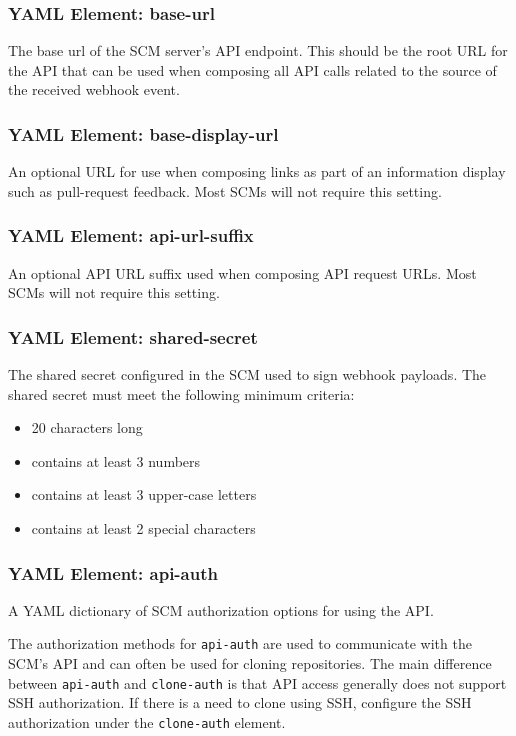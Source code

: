 \subsubsection{YAML Element: base-url}\label{sec:yaml-connection-base-url}
The base url of the SCM server's API endpoint. This should be the root URL for the API that can be used when composing all
API calls related to the source of the received webhook event.

\subsubsection{YAML Element: base-display-url}\label{sec:yaml-connection-base-display-url}
An optional URL for use when composing links as part of an information display such as pull-request
feedback. Most SCMs will not require this setting.

\subsubsection{YAML Element: api-url-suffix}\label{sec:yaml-connection-api-url-suffix}
An optional API URL suffix used when composing API request URLs. Most SCMs will not require this setting.

\subsubsection{YAML Element: shared-secret}\label{sec:yaml-connection-shared-secret}
The shared secret configured in the SCM used to sign webhook payloads. The shared secret must meet the
following minimum criteria: 

\begin{itemize}
  \item 20 characters long
  \item contains at least 3 numbers
  \item contains at least 3 upper-case letters
  \item contains at least 2 special characters
\end{itemize}

\subsubsection{YAML Element: api-auth}\label{sec:yaml-connection-api-auth}
A YAML dictionary of SCM authorization options for using the API.

The authorization methods for \texttt{api-auth} 
are used to communicate with the SCM's API and can often be used for cloning repositories.  The
main difference between \texttt{api-auth} and \texttt{clone-auth} is that API access generally
does not support SSH authorization. If there is a need to clone using SSH, configure the SSH
authorization under the \texttt{clone-auth} element.  

